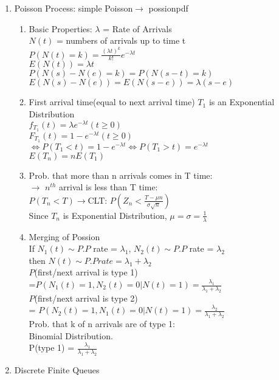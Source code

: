 \documentclass[10pt]{article}
\begin{document}
\begin{multicols}{2}
\begin{enumerate}
\item Poisson Process: simple Poisson$\rightarrow$ possionpdf
\begin{enumerate}
	\item Basic Properties: $\lambda$ = Rate of Arrivals\\
	$N(t)$ = numbers of arrivals up to time t\\
	$P(N(t) = k) = \frac{(\lambda t)^k}{k!}e^{-\lambda t}$\\
	$E(N(t)) = \lambda t$\\
	$P(N(s)-N(e) = k) = P(N(s-t) = k)$\\
	$E(N(s)-N(e)) = E(N(s-e)) = \lambda(s-e)$
	\item First arrival time(equal to next arrival time) $T_1$ is an Exponential Distribution\\
	$f_{T_1}(t) = \lambda e^{-\lambda t} (t \ge 0)$\\
	$F_{T_1}(t) = 1-e^{-\lambda t} (t \ge 0)$\\
	$\Leftrightarrow P(T_1 < t) = 1-e^{-\lambda t}\Leftrightarrow P(T_1>t) = e^{-\lambda t}$\\
	$E(T_n) = nE(T_1)$
	\item Prob. that more than n arrivals comes in T time:\\
	$\rightarrow$ $n^{th}$ arrival is less than T time:\\
	$P(T_n < T) \rightarrow$CLT: $P(Z_n < \frac{T - \mu n}{\sigma \sqrt n})$\\
	Since $T_n$ is Exponential Distribution, $\mu = \sigma = \frac{1}{\lambda}$
	\item Merging of Possion\\
	If $N_1(t)\sim P.P$ rate = $\lambda_1$, $N_2(t)\sim P.P$ rate = $\lambda_2$\\
	then $N(t) \sim P.P rate = \lambda_1 + \lambda_2$\\
	$P$(first/next arrival is type 1)\\
	 =$P(N_1(t) = 1, N_2(t) = 0 | N(t) = 1)
	 =\frac{\lambda_1}{\lambda_1+\lambda_2}$\\
	 $P$(first/next arrival is type 2)\\
	 = $P(N_2(t) = 1, N_1(t) = 0 | N(t) = 1)
	 = \frac{\lambda_2}{\lambda_1+\lambda_2}$\\
	 Prob. that k of n arrivals are of type 1: \\Binomial Distribution.\\
	 P(type 1) = $\frac{\lambda_1}{\lambda_1+\lambda_2}$
	\end{enumerate}
	\item Discrete Finite Queues\\

\end{enumerate}
\end{multicols}
\end{document}
